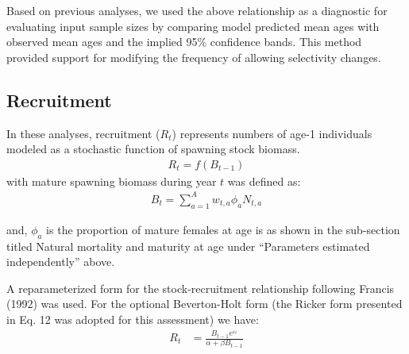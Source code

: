 \documentclass[11pt,
  english,
  a4paper,
]{article}
\begin{document}
Based on previous analyses, we used the above relationship as a diagnostic for evaluating input sample sizes by comparing model predicted mean ages with observed mean ages and the implied 95\% confidence bands. This method provided support for modifying the frequency of allowing selectivity changes.

\leavevmode\tagmcend\tagstructend\par


\hypertarget{recruitment-1}{%
\subsection{Recruitment}\label{recruitment-1}}

\leavevmode\tagmcend\tagstructend


In these analyses, recruitment ({\(R_t\)\leavevmode\tagmcend\tagstructend}) represents numbers of age-1 individuals modeled as a stochastic function of spawning stock biomass. \begin{align}
        R_t = f\left(B_{t-1} \right)
\end{align} with mature spawning biomass during year {\(t\)\leavevmode\tagmcend\tagstructend} was defined as: \begin{align}
  B_t = \sum_{a=1}^A{ w_{t,a}\phi_aN_{t,a}} 
\end{align}

\leavevmode\tagmcend\tagstructend\par


and, {\(\phi_a\)\leavevmode\tagmcend\tagstructend} is the proportion of mature females at age is as shown in the sub-section titled Natural mortality and maturity at age under ``Parameters estimated independently'' above.

\leavevmode\tagmcend\tagstructend\par


A reparameterized form for the stock-recruitment relationship following Francis (1992) was used. For the optional Beverton-Holt form (the Ricker form presented in Eq. 12 was adopted for this assessment) we have: \begin{align}
R_t &= \frac{B_{t-1}e^{\varepsilon_t} }{\alpha+\beta B_{t-1} }
\end{align}
\end{document}
